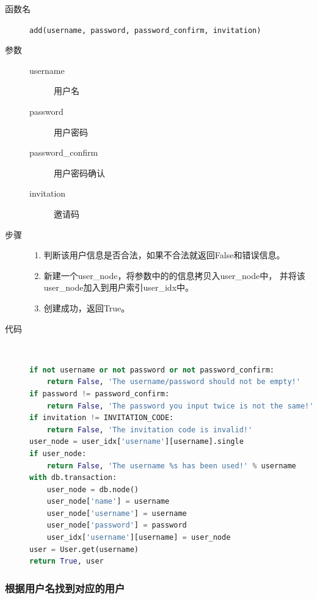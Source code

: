 \documentclass{yaldc}
\begin{document}
\begin{description}
    \item[函数名] \verb|add(username, password, password_confirm, invitation)|
    \item[参数]
        \begin{description}
            \item[username] 用户名
            \item[password] 用户密码
            \item[password\_confirm] 用户密码确认
            \item[invitation] 邀请码
        \end{description}
    \item[步骤]
        \begin{enumerate}
            \item 判断该用户信息是否合法，如果不合法就返回False和错误信息。
            \item 新建一个user\_node，将参数中的的信息拷贝入user\_node中，
                并将该user\_node加入到用户索引user\_idx中。
            \item 创建成功，返回True。
        \end{enumerate}
    \item[代码] ~
        \begin{lstlisting}[language=Python]
if not username or not password or not password_confirm:
    return False, 'The username/password should not be empty!'
if password != password_confirm:
    return False, 'The password you input twice is not the same!'
if invitation != INVITATION_CODE:
    return False, 'The invitation code is invalid!'
user_node = user_idx['username'][username].single
if user_node:
    return False, 'The username %s has been used!' % username
with db.transaction:
    user_node = db.node()
    user_node['name'] = username
    user_node['username'] = username
    user_node['password'] = password
    user_idx['username'][username] = user_node
user = User.get(username)
return True, user
        \end{lstlisting}
\end{description}

\subsubsection{根据用户名找到对应的用户}
\end{document}
